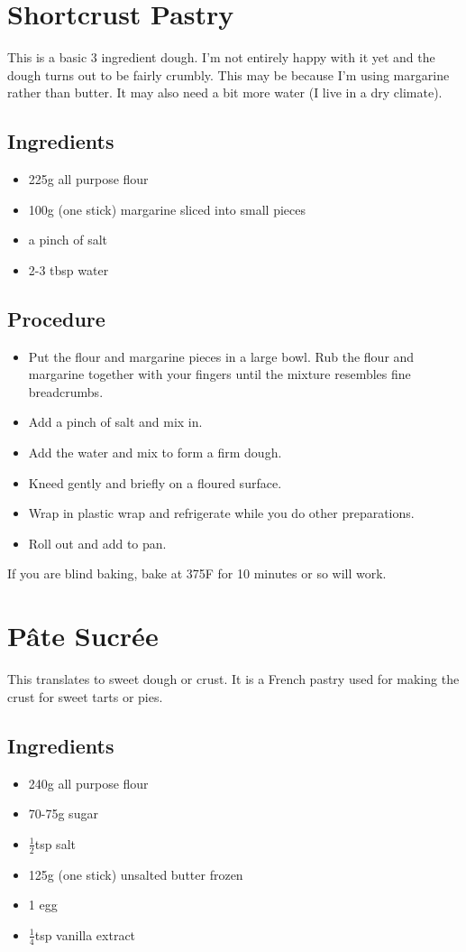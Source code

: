 \documentclass[10pt, openany]{book}
\begin{document}
\section{Shortcrust Pastry}
\label{pastry:shortcrust}
This is a basic 3 ingredient dough.  I'm not entirely happy with it yet and the dough turns out to be fairly crumbly.  This may be because I'm using margarine rather than butter.  It may also need a bit more water (I live in a dry climate).
\subsection{Ingredients}
\begin{itemize}
  \item 225g all purpose flour
  \item 100g (one stick) margarine sliced into small pieces
  \item a pinch of salt
  \item 2-3 tbsp water
\end{itemize}
\subsection{Procedure}
\begin{itemize}
  \item Put the flour and margarine pieces in a large bowl.  Rub the flour and margarine together with your fingers until the mixture resembles fine breadcrumbs.
  \item Add a pinch of salt and mix in.
  \item Add the water and mix to form a firm dough.
  \item Kneed gently and briefly on a floured surface.
  \item Wrap in plastic wrap and refrigerate while you do other preparations.
  \item Roll out and add to pan.
\end{itemize}
If you are blind baking, bake at 375\degree{}F for 10 minutes or so will work.

\section{P\^ate Sucr\'ee}
\label{pie:PateSucree}
This translates to sweet dough or crust.  It is a French pastry used for making the crust for sweet tarts or pies.
\subsection{Ingredients}
\begin{itemize}
  \item 240g all purpose flour
  \item 70-75g sugar
  \item $\frac{1}{2}$tsp salt
  \item 125g (one stick) unsalted butter frozen
  \item 1 egg
  \item $\frac{1}{4}$tsp vanilla extract
\end{itemize}
\end{document}
